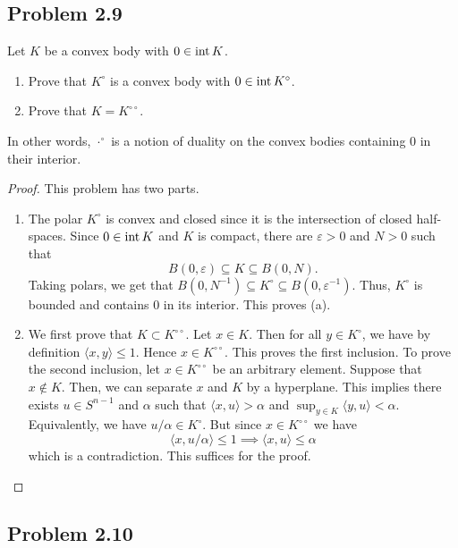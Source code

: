\documentclass[12pt]{article}
\begin{document}
\newpage 

\subsection{Problem 2.9}

\begin{problem} \label{problem-2.9}
	Let $K$ be a convex body with $0 \in \operatorname{int} K$. 
    \begin{enumerate}[label = (\alph*)]
        \item Prove that $K^\circ$ is a convex body with $0 \in \operatorname{int} K^\circ$. 
        \item Prove that $K = K^{\circ \circ}$. 
    \end{enumerate}
    In other words, $\cdot^{\circ}$ is a notion of duality on the convex bodies containing $0$ in their interior.
\end{problem}
\begin{proof}
	This problem has two parts. 
	\begin{enumerate}[label = (\alph*)]
		\item The polar $K^\circ$ is convex and closed since it is the intersection of closed half-spaces. Since $0 \in \operatorname{int} K$ and $K$ is compact, there are $\varepsilon > 0$ and $N > 0$ such that 
		\[
			B(0, \varepsilon) \subseteq K \subseteq B(0, N).
		\]
		Taking polars, we get that $B(0, N^{-1}) \subseteq K^\circ \subseteq B(0, \varepsilon^{-1})$. Thus, $K^\circ$ is bounded and contains $0$ in its interior. This proves (a). 
		\item We first prove that $K \subset K^{\circ \circ}$. Let $x \in K$. Then for all $y \in K^\circ$, we have by definition $\langle x, y \rangle \leq 1$. Hence $x \in K^{\circ \circ}$. This proves the first inclusion. To prove the second inclusion, let $x \in K^{\circ \circ}$ be an arbitrary element. Suppose that $x \notin K$. Then, we can separate $x$ and $K$ by a hyperplane. This implies there exists $u \in S^{n-1}$ and $\alpha$ such that $\langle x, u \rangle > \alpha$ and $\sup_{y \in K} \langle y, u \rangle < \alpha$. Equivalently, we have $u / \alpha \in K^\circ$. But since $x \in K^{\circ \circ}$ we have 
		\[
			\langle x, u / \alpha \rangle \leq 1 \implies \langle x , u \rangle \leq \alpha
		\] 
		which is a contradiction. This suffices for the proof. 
	\end{enumerate}
\end{proof}

\newpage 

\subsection{Problem 2.10}
\end{document}
